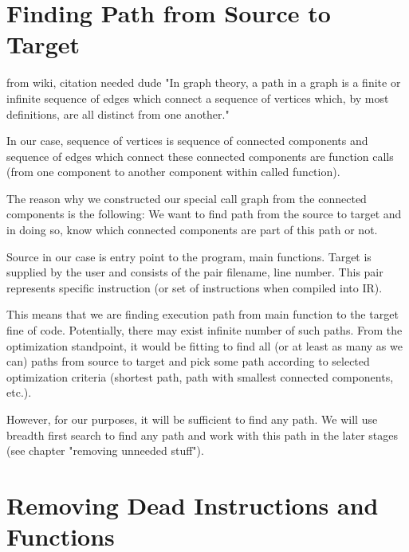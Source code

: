 \documentclass[12pt, twoside]{fithesis2}
\renewcommand{\_}{\leavevmode \kern0.07em\vbox{\hrule width0.4em}}
\begin{document}
\section{Finding Path from Source to Target}
\label{sec:design-path}


from wiki, citation needed dude "In graph theory, a path in a graph is a finite
or infinite sequence of edges which connect a sequence of vertices which, by
most definitions, are all distinct from one another."

In our case, sequence of vertices is sequence of connected components and
sequence of edges which connect these connected components are function calls
(from one component to another component within called function).

The reason why we constructed our special call graph from the connected
components is the following: We want to find path from the source to target and
in doing so, know which connected components are part of this path or not.

Source in our case is entry point to the program, main functions. Target is
supplied by the user and consists of the pair filename, line number. This pair
represents specific instruction (or set of instructions when compiled into IR).

This means that we are finding execution path from main function to the target
fine of code. Potentially, there may exist infinite number of such paths. From
the optimization standpoint, it would be fitting to find all (or at least as
many as we can) paths from source to target and pick some path according to
selected optimization criteria (shortest path, path with smallest connected
components, etc.).

However, for our purposes, it will be sufficient to find any path. We will use
breadth first search to find any path and work with this path in the later
stages (see chapter "removing unneeded stuff").


\section{Removing Dead Instructions and Functions}
\label{sec:design-removing}

\end{document}
